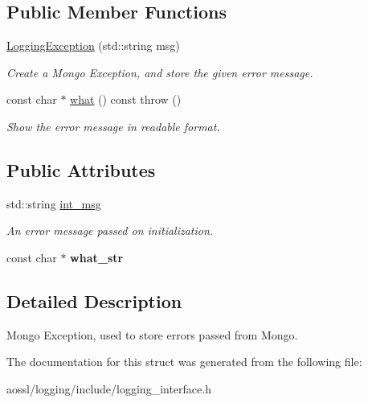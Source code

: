 \subsection*{Public Member Functions}
\begin{DoxyCompactItemize}
\item 
\hyperlink{structLoggingException_ab82d378b1a05f798ab9b738c79dbec16}{Logging\+Exception} (std\+::string msg)\hypertarget{structLoggingException_ab82d378b1a05f798ab9b738c79dbec16}{}\label{structLoggingException_ab82d378b1a05f798ab9b738c79dbec16}

\begin{DoxyCompactList}\small\item\em Create a Mongo Exception, and store the given error message. \end{DoxyCompactList}\item 
const char $\ast$ \hyperlink{structLoggingException_a2a34c710bcde768940ae6029c2a93f48}{what} () const   throw ()\hypertarget{structLoggingException_a2a34c710bcde768940ae6029c2a93f48}{}\label{structLoggingException_a2a34c710bcde768940ae6029c2a93f48}

\begin{DoxyCompactList}\small\item\em Show the error message in readable format. \end{DoxyCompactList}\end{DoxyCompactItemize}
\subsection*{Public Attributes}
\begin{DoxyCompactItemize}
\item 
std\+::string \hyperlink{structLoggingException_a7b6e62811431fd0f9fc77a70b7e03bb6}{int\+\_\+msg}\hypertarget{structLoggingException_a7b6e62811431fd0f9fc77a70b7e03bb6}{}\label{structLoggingException_a7b6e62811431fd0f9fc77a70b7e03bb6}

\begin{DoxyCompactList}\small\item\em An error message passed on initialization. \end{DoxyCompactList}\item 
const char $\ast$ {\bfseries what\+\_\+str}\hypertarget{structLoggingException_a9734ededaca3a49f66302587e3611c4b}{}\label{structLoggingException_a9734ededaca3a49f66302587e3611c4b}

\end{DoxyCompactItemize}


\subsection{Detailed Description}
Mongo Exception, used to store errors passed from Mongo. 

The documentation for this struct was generated from the following file\+:\begin{DoxyCompactItemize}
\item 
aossl/logging/include/logging\+\_\+interface.\+h\end{DoxyCompactItemize}
